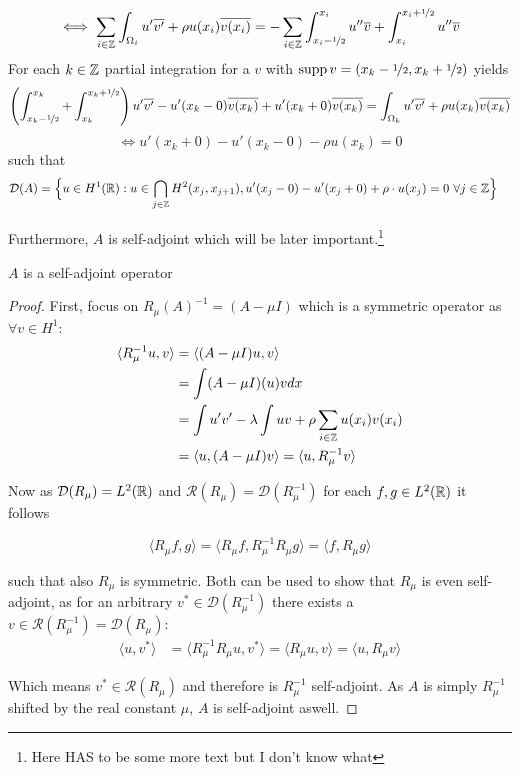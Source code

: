 	\[ \iff \sum_{i \in \mathbb{Z}} \int_{\Omega_{i}} u' \overline{v'} + \rho u(x_{i}) \overline{v(x_{i})} = - \sum_{i \in \mathbb{Z}} \int_{x_{i} - \nicefrac{1}{2}}^{x_{i}} u'' \overline{v} + \int_{x_{i}}^{x_{i} + \nicefrac{1}{2}} u'' \overline{v} \]
	For each $k \in \mathbb{Z}$ partial integration for a $v$ with $\operatorname{supp} v = (x_{k} - \nicefrac{1}{2}, x_{k} + \nicefrac{1}{2})$ yields
	\[ \left( \int_{x_{k} - \nicefrac{1}{2}}^{x_{k}} + \int_{x_{k}}^{x_{k} +\nicefrac{1}{2}} \right) u' \overline{v'} - u'(x_{k}-0) \overline{v(x_{k})}  + u'(x_{k}+0) \overline{v(x_{k})}  = \int_{\Omega_{k}} u' \overline{v'} + \rho u(x_{k}) \overline{v(x_{k})} \]
	\[ \iff u'(x_{k}+0) - u'(x_{k}-0) - \rho u(x_{k}) = 0 \]
	such that
	\begin{align*}
		\mathcal{D}(A) & = \Big\{ u \in H^{1}(\mathbb{R}): u \in \bigcap_{j \in \mathbb{Z}} H^{2}(x_{j} , x_{j+1}), u'(x_{j} - 0) - u'(x_{j} + 0) + \rho \cdot u(x_{j}) = 0 ~\forall j \in \mathbb{Z} \Big\}
	\end{align*}

Furthermore, $A$ is self-adjoint which will be later important.\footnote{Here HAS to be some more text but I don't know what}

\begin{theorem}
	$A$ is a self-adjoint operator
		
	\begin{proof} %
		First, focus on $R_{\mu}(A)^{-1} = (A - \mu I)$ which is a symmetric operator as $\forall v \in H^{1}$:
			\begin{align*}
				\langle R_{\mu}^{-1} u, v \rangle & = \langle (A - \mu I) u, v \rangle \\
					& = \int (A - \mu I)(u) v dx \\
					& = \int u'v' -  \lambda \int u v + \rho \sum_{i \in \mathbb{Z}} u(x_{i}) v(x_{i}) \\
					& = \langle u, (A - \mu I) v \rangle = \langle u,  R_{\mu}^{-1} v \rangle 
			\end{align*}

		Now as $\mathcal{D}(R_{\mu}) = L^{2}(\mathbb{R})$ and $\mathcal{R}(R_{\mu}) = \mathcal{D}(R_{\mu}^{-1})$ for each $f, g \in L^{2}(\mathbb{R})$ it follows
		
		\[  \langle R_{\mu} f, g \rangle =  \langle R_{\mu} f, R_{\mu}^{-1} R_{\mu} g \rangle = \langle f, R_{\mu} g \rangle \]
		
		such that also $R_{\mu}$ is symmetric. Both can be used to show that $R_{\mu}$ is even self-adjoint, as for an arbitrary $v^{*} \in \mathcal{D}(R_{\mu}^{-1})$ there exists a $v \in \mathcal{R}(R_{\mu}^{-1}) = \mathcal{D}(R_{\mu})$:
		\begin{align*}
			\langle u, v^{*} \rangle & = \langle R_{\mu}^{-1} R_{\mu} u , v^{*} \rangle = \langle R_{\mu} u, v \rangle  = \langle  u, R_{\mu} v \rangle 
		\end{align*}
		
		Which means $v^{*} \in \mathcal{R}(R_{\mu})$ and therefore is $R_{\mu}^{-1}$  self-adjoint. As $A$ is simply $R_{\mu}^{-1}$ shifted by the real constant $\mu$, $A$ is self-adjoint aswell.		
	\end{proof}
\end{theorem}